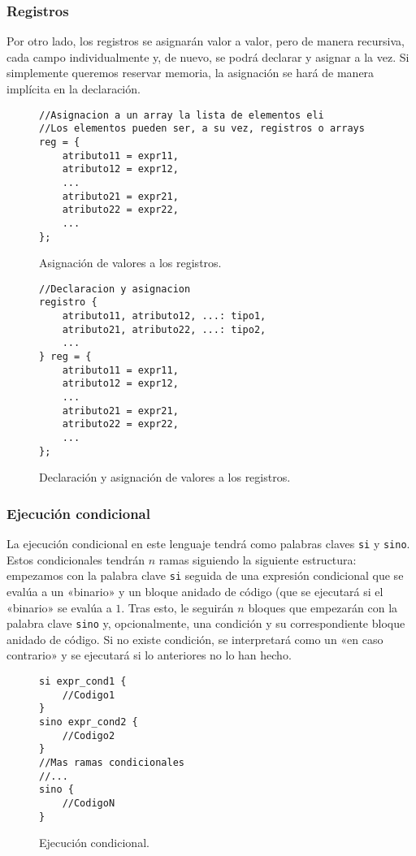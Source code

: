 \subsubsection{Registros}
Por otro lado, los registros se asignarán valor a valor, pero de manera
recursiva, cada campo individualmente y, de nuevo, se podrá declarar y asignar a
la vez. Si simplemente queremos reservar memoria, la asignación se hará de
manera implícita en la declaración.
\begin{figure}[htbp]
    \centering
    \begin{lstlisting}
//Asignacion a un array la lista de elementos eli
//Los elementos pueden ser, a su vez, registros o arrays
reg = {
    atributo11 = expr11,
    atributo12 = expr12,
    ...
    atributo21 = expr21,
    atributo22 = expr22,
    ...
};
    \end{lstlisting}
    \caption{Asignación de valores a los registros.}
\end{figure}

\begin{figure}[htbp]
    \centering
    \begin{lstlisting}
//Declaracion y asignacion
registro {
    atributo11, atributo12, ...: tipo1,
    atributo21, atributo22, ...: tipo2,
    ...
} reg = {
    atributo11 = expr11,
    atributo12 = expr12,
    ...
    atributo21 = expr21,
    atributo22 = expr22,
    ...
};
    \end{lstlisting}
    \caption{Declaración y asignación de valores a los registros.}
\end{figure}

\subsubsection{Ejecución condicional}
La ejecución condicional en este lenguaje tendrá como palabras claves \lstinline{si} y
\lstinline{sino}. Estos condicionales tendrán $n$ ramas siguiendo la siguiente estructura:
empezamos con la palabra clave \lstinline{si} seguida de una expresión condicional que se
evalúa a un «binario» y un bloque anidado de código (que se ejecutará si el
«binario» se evalúa a $1$. Tras esto, le seguirán $n$ bloques que empezarán con
la palabra clave \lstinline{sino} y, opcionalmente, una condición y su correspondiente
bloque anidado de código. Si no existe condición, se interpretará como un «en
caso contrario» y se ejecutará si lo anteriores no lo han hecho.
\begin{figure}[htbp]
    \centering
    \begin{lstlisting}
si expr_cond1 {
    //Codigo1
}
sino expr_cond2 {
    //Codigo2
} 
//Mas ramas condicionales
//...
sino {
    //CodigoN
}
    \end{lstlisting}
    \caption{Ejecución condicional.}
\end{figure}

